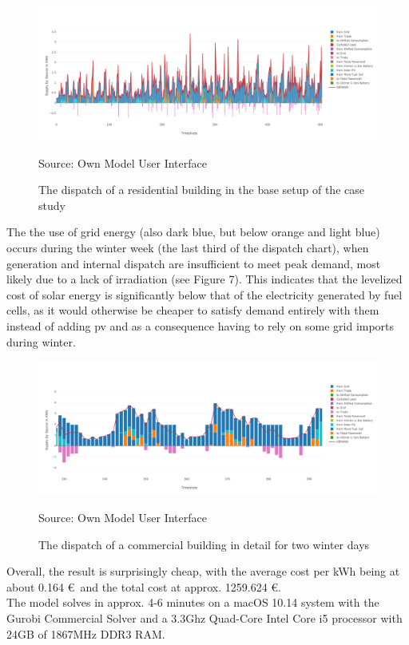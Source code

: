 \documentclass[
	11pt,								%
	DIV10,								%
	a4paper,         					%
	oneside,							%
	headheight=20pt,					%
	footheight=20pt,					%
    parskip=full,						%
    listof=totoc,						%
	bibliography=totoc,					%
	index=totoc,						%
]{scrartcl}
\begin{document}
\begin{figure}[H]
	\centering
	\includegraphics[width=1\textwidth]{pictures/RES_1_Base.png}
	\caption{The dispatch of a residential building in the base setup of the case study}
	\label{residential_dispatch_base}
	\flushleft\quad\quad\footnotesize{Source: Own Model User Interface}
\end{figure}	

The the use of grid energy (also dark blue, but below orange and light blue) occurs during the winter week (the last third of the dispatch chart), when generation and internal dispatch are insufficient to meet peak demand, most likely due to a lack of irradiation (see Figure 7). This indicates that the levelized cost of solar energy is significantly below that of the electricity generated by fuel cells, as it would otherwise be cheaper to satisfy demand entirely with them instead of adding pv and as a consequence having to rely on some grid imports during winter.

\begin{figure}[H]
	\centering
	\includegraphics[width=1\textwidth]{pictures/COM_2_ZOOM_Base.png}
	\caption{The dispatch of a commercial building in detail for two winter days}
	\label{commercial_dispatch_base}
	\flushleft\quad\quad\footnotesize{Source: Own Model User Interface}
\end{figure}	

Overall, the result is surprisingly cheap, with the average cost per kWh being at about 0.164 \euro\ and the total cost at approx. 1259.624 \euro.\\
The model solves in approx. 4-6 minutes on a macOS 10.14 system with the Gurobi Commercial Solver and a 3.3Ghz Quad-Core Intel Core i5 processor with 24GB of 1867MHz DDR3 RAM.
\end{document}
